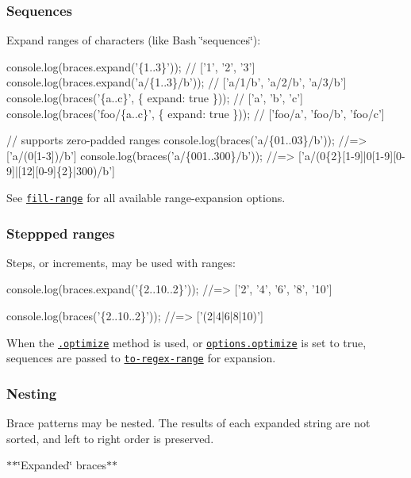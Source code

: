 \subsubsection*{Sequences}

Expand ranges of characters (like Bash \char`\"{}sequences\char`\"{})\+:


\begin{DoxyCode}
console.log(braces.expand('\{1..3\}'));                // ['1', '2', '3']
console.log(braces.expand('a/\{1..3\}/b'));            // ['a/1/b', 'a/2/b', 'a/3/b']
console.log(braces('\{a..c\}', \{ expand: true \}));     // ['a', 'b', 'c']
console.log(braces('foo/\{a..c\}', \{ expand: true \})); // ['foo/a', 'foo/b', 'foo/c']

// supports zero-padded ranges
console.log(braces('a/\{01..03\}/b'));   //=> ['a/(0[1-3])/b']
console.log(braces('a/\{001..300\}/b')); //=> ['a/(0\{2\}[1-9]|0[1-9][0-9]|[12][0-9]\{2\}|300)/b']
\end{DoxyCode}


See \href{https://github.com/jonschlinkert/fill-range}{\tt fill-\/range} for all available range-\/expansion options.

\subsubsection*{Steppped ranges}

Steps, or increments, may be used with ranges\+:


\begin{DoxyCode}
console.log(braces.expand('\{2..10..2\}'));
//=> ['2', '4', '6', '8', '10']

console.log(braces('\{2..10..2\}'));
//=> ['(2|4|6|8|10)']
\end{DoxyCode}


When the \href{#optimize}{\tt .optimize} method is used, or \href{#optionsoptimize}{\tt options.\+optimize} is set to true, sequences are passed to \href{https://github.com/jonschlinkert/to-regex-range}{\tt to-\/regex-\/range} for expansion.

\subsubsection*{Nesting}

Brace patterns may be nested. The results of each expanded string are not sorted, and left to right order is preserved.

$\ast$$\ast$\char`\"{}\+Expanded\char`\"{} braces$\ast$$\ast$


